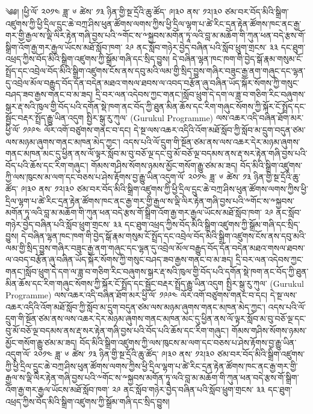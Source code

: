 \documentclass{article}
\begin{document}
\Large ༄༅། །ཕྱི་ལོ་ ༢༠༡༤ ཟླ་ ༦ ཚེས་ ༡༣ ཉིན་གྱི་སྔ་དྲོའི་ཆུ་ཚོད་ ༩།༣༠ ནས་ ༡༢།༣༠ ཙམ་བར་བོད་མིའི་སྒྲིག་འཛུགས་ཀྱི་ཕྱི་དྲིལ་དྲུང་ཆེ་བཀྲ་ཤིས་ཕུན་ཚོགས་ལགས་ཀྱིས་ཕྱི་དྲིལ་ལྷག་པ་ཚེ་རིང་དྲན་རྟེན་ཚོགས་ཁང་ནང་རྒྱ་གར་གྱི་རྒྱལ་ས་ལྡི་ལིར་རྟེན་གཞི་བྱས་པའི་༸གོང་ས་༸སྐྱབས་མགོན་ཏཱ་ལའི་བླ་མ་མཆོག་གི་ཀུན་ཕན་བདེ་རྩས་གོ་སྒྲིག་འོག་རྒྱ་གར་རྒྱལ་ཡོངས་མཐོ་སློབ་ཁག་ ༢༩ ནང་སློབ་གཉེར་བྱེད་བཞིན་པའི་སློབ་ཕྲུག་གྲངས་ ༣༣ དང་ཐུག་འཕྲད་ཀྱིས་བོད་མིའི་སྒྲིག་འཛུགས་ཀྱི་སྒྲོམ་གཞི་དང་སྲིད་བྱུས། དེ་བཞིན་ལྷན་ཁང་ཁག་གི་བྱེད་སྒོ་རྣམ་གསུམ་ངོ་སྤྲོད་དང་འབྲེལ་བོད་མིའི་སྒྲིག་འཛུགས་ངོས་ནས་དབུ་མའི་ལམ་གྱི་སྲིད་བྱུས་གཞིར་བཟུང་རྒྱ་ནག་གཞུང་དང་ལྷན་དུ་འབྲེལ་མོལ་བརྒྱུད་བོད་དོན་བདེན་མཐའ་གསལ་ཐབས་ལ་འབད་བརྩོན་ཞུ་བཞིན་ཡོད་སྐོར་སོགས་ཀྱི་གསུང་བཤད་ཟབ་རྒྱས་གནང་བ་མ་ཟད། དྲི་བར་ལན་འདེབས་ཀྱང་གནང་།སློབ་ཕྲུག་དེ་དག་ལ་ཟླ་བ་གཅིག་རིང་བཞུགས་སྒར་རྡ་སའི་ཁུལ་གྱི་བོད་པའི་དགོན་སྡེ་ཁག་ནང་བོད་ཀྱི་ཐུན་མིན་ཆོས་དང་རིག་གཞུང་སོགས་ཀྱི་སྐོར་ངོ་སྤྲོད་དང་སྦྱོང་བརྡར་སྤྲོད་རྒྱུ་ཡིན་འདུག སྤྱིར་སྒུ་རུ་ཀུལ་ (Gurukul Programme) ལས་འཆར་འདི་བཞིན་ཐོག་མར་ཕྱི་ལོ་ ༡༩༩༤ ལོར་འགོ་བཙུགས་གནང་བ་དང། དེ་སྔ་ལས་འཆར་འདིའི་འོག་མཐོ་སློབ་ཀྱི་སློབ་མ་དྲུག་བདུན་ཙམ་ལས་མཉམ་ཞུགས་གནང་མཁན་མེད་ཀྱང་། འདས་པའི་ལོ་དྲུག་གི་སྔོན་ཙམ་ནས་ལས་འཆར་དེར་མཉམ་ཞུགས་གནང་མཁན་མང་དུ་ཕྱིན་ནས་ལོ་ལྟར་སློབ་མ་བུ་བཅོ་ལྔ་དང་བུ་མོ་བཅོ་ལྔ་བདམས་ནས་རྡ་སར་རྟེན་གཞི་བྱས་པའི་བོད་པའི་ཆོས་དང་རིག་གཞུང་། གོམས་གཤིས་སོགས་ཉམས་མྱོང་གསོག་རྒྱུ་ཙམ་མ་ཟད། བོད་མིའི་སྒྲིག་འཛུགས་ཀྱི་ལས་ཁུངས་མ་ལག་དང་བཅས་པ་ཤེས་རྟོགས་བྱ་རྒྱུ་ཡིན་འདུག་ལོ་ ༢༠༡༤ ཟླ་ ༦ ཚེས་ ༡༣ ཉིན་གྱི་སྔ་དྲོའི་ཆུ་ཚོད་ ༩།༣༠ ནས་ ༡༢།༣༠ ཙམ་བར་བོད་མིའི་སྒྲིག་འཛུགས་ཀྱི་ཕྱི་དྲིལ་དྲུང་ཆེ་བཀྲ་ཤིས་ཕུན་ཚོགས་ལགས་ཀྱིས་ཕྱི་དྲིལ་ལྷག་པ་ཚེ་རིང་དྲན་རྟེན་ཚོགས་ཁང་ནང་རྒྱ་གར་གྱི་རྒྱལ་ས་ལྡི་ལིར་རྟེན་གཞི་བྱས་པའི་༸གོང་ས་༸སྐྱབས་མགོན་ཏཱ་ལའི་བླ་མ་མཆོག་གི་ཀུན་ཕན་བདེ་རྩས་གོ་སྒྲིག་འོག་རྒྱ་གར་རྒྱལ་ཡོངས་མཐོ་སློབ་ཁག་ ༢༩ ནང་སློབ་གཉེར་བྱེད་བཞིན་པའི་སློབ་ཕྲུག་གྲངས་ ༣༣ དང་ཐུག་འཕྲད་ཀྱིས་བོད་མིའི་སྒྲིག་འཛུགས་ཀྱི་སྒྲོམ་གཞི་དང་སྲིད་བྱུས། དེ་བཞིན་ལྷན་ཁང་ཁག་གི་བྱེད་སྒོ་རྣམ་གསུམ་ངོ་སྤྲོད་དང་འབྲེལ་བོད་མིའི་སྒྲིག་འཛུགས་ངོས་ནས་དབུ་མའི་ལམ་གྱི་སྲིད་བྱུས་གཞིར་བཟུང་རྒྱ་ནག་གཞུང་དང་ལྷན་དུ་འབྲེལ་མོལ་བརྒྱུད་བོད་དོན་བདེན་མཐའ་གསལ་ཐབས་ལ་འབད་བརྩོན་ཞུ་བཞིན་ཡོད་སྐོར་སོགས་ཀྱི་གསུང་བཤད་ཟབ་རྒྱས་གནང་བ་མ་ཟད། དྲི་བར་ལན་འདེབས་ཀྱང་གནང་།སློབ་ཕྲུག་དེ་དག་ལ་ཟླ་བ་གཅིག་རིང་བཞུགས་སྒར་རྡ་སའི་ཁུལ་གྱི་བོད་པའི་དགོན་སྡེ་ཁག་ནང་བོད་ཀྱི་ཐུན་མིན་ཆོས་དང་རིག་གཞུང་སོགས་ཀྱི་སྐོར་ངོ་སྤྲོད་དང་སྦྱོང་བརྡར་སྤྲོད་རྒྱུ་ཡིན་འདུག སྤྱིར་སྒུ་རུ་ཀུལ་ (Gurukul Programme) ལས་འཆར་འདི་བཞིན་ཐོག་མར་ཕྱི་ལོ་ ༡༩༩༤ ལོར་འགོ་བཙུགས་གནང་བ་དང། དེ་སྔ་ལས་འཆར་འདིའི་འོག་མཐོ་སློབ་ཀྱི་སློབ་མ་དྲུག་བདུན་ཙམ་ལས་མཉམ་ཞུགས་གནང་མཁན་མེད་ཀྱང་། འདས་པའི་ལོ་དྲུག་གི་སྔོན་ཙམ་ནས་ལས་འཆར་དེར་མཉམ་ཞུགས་གནང་མཁན་མང་དུ་ཕྱིན་ནས་ལོ་ལྟར་སློབ་མ་བུ་བཅོ་ལྔ་དང་བུ་མོ་བཅོ་ལྔ་བདམས་ནས་རྡ་སར་རྟེན་གཞི་བྱས་པའི་བོད་པའི་ཆོས་དང་རིག་གཞུང་། གོམས་གཤིས་སོགས་ཉམས་མྱོང་གསོག་རྒྱུ་ཙམ་མ་ཟད། བོད་མིའི་སྒྲིག་འཛུགས་ཀྱི་ལས་ཁུངས་མ་ལག་དང་བཅས་པ་ཤེས་རྟོགས་བྱ་རྒྱུ་ཡིན་འདུག་ལོ་ ༢༠༡༤ ཟླ་ ༦ ཚེས་ ༡༣ ཉིན་གྱི་སྔ་དྲོའི་ཆུ་ཚོད་ ༩།༣༠ ནས་ ༡༢།༣༠ ཙམ་བར་བོད་མིའི་སྒྲིག་འཛུགས་ཀྱི་ཕྱི་དྲིལ་དྲུང་ཆེ་བཀྲ་ཤིས་ཕུན་ཚོགས་ལགས་ཀྱིས་ཕྱི་དྲིལ་ལྷག་པ་ཚེ་རིང་དྲན་རྟེན་ཚོགས་ཁང་ནང་རྒྱ་གར་གྱི་རྒྱལ་ས་ལྡི་ལིར་རྟེན་གཞི་བྱས་པའི་༸གོང་ས་༸སྐྱབས་མགོན་ཏཱ་ལའི་བླ་མ་མཆོག་གི་ཀུན་ཕན་བདེ་རྩས་གོ་སྒྲིག་འོག་རྒྱ་གར་རྒྱལ་ཡོངས་མཐོ་སློབ་ཁག་ ༢༩ ནང་སློབ་གཉེར་བྱེད་བཞིན་པའི་སློབ་ཕྲུག་གྲངས་ ༣༣ དང་ཐུག་འཕྲད་ཀྱིས་བོད་མིའི་སྒྲིག་འཛུགས་ཀྱི་སྒྲོམ་གཞི་དང་སྲིད་བྱུས། 
\end{document}
